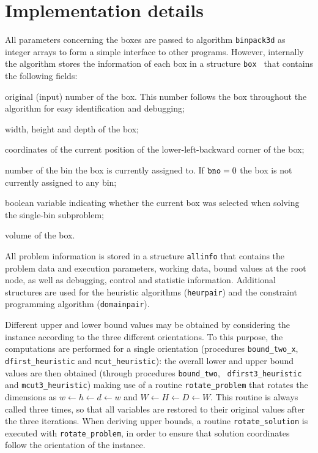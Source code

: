 \section{Implementation details}\label{datastruct}

All parameters {concerning the boxes}
are passed to algorithm {\tt binpack3d} as integer
arrays to form a simple interface to other programs. {However,
internally the algorithm stores} the information of each box in a
structure {\tt box
} that contains the following fields:
\medskip

\noindent
%
 \parbox[t]{13.5cm}{original (input) number of the box. This
number follows the box throughout the algorithm for easy
identification and debugging;}\medskip

\noindent
{} \parbox[t]{13.5cm}{width,
height and depth of the box;}\medskip

\noindent
{} \parbox[t]{13.5cm}{coordinates of
the current position of the lower-left-backward corner of the
box;}\medskip

\noindent
{}
\parbox[t]{13.5cm}{number of the bin the box is currently assigned
to. If ${\tt bno}=0$ the box is not currently assigned to any
bin;}\medskip

\noindent
{} \parbox[t]{13.5cm}{boolean
variable indicating whether the current box was selected when
solving the single-bin subproblem;}\medskip

\noindent
{}
\parbox[t]{13.5cm}{volume of the box.}
\medskip

\noindent
{All problem information is stored in a structure {\tt allinfo}
that contains the problem data and execution parameters, working data,
bound values at the root node, as well as debugging, control and statistic
information. Additional structures are used for the heuristic algorithms
({\tt heurpair}) and the constraint programming algorithm
({\tt domainpair}).
}

Different upper and lower bound values may be
obtained by considering the instance according to the three
different orientations. {To this purpose, the computations are
performed for a single orientation (procedures {\tt bound\_two\_x},
{\tt dfirst\_heuristic} and {\tt mcut\_heuristic}): the overall lower and
upper bound values are then obtained (through procedures {\tt bound\_two}, {\tt
dfirst3\_heuristic} and {\tt mcut3\_heuristic})
making use of a routine {\tt rotate\_problem} that rotates the
dimensions as $w \leftarrow h \leftarrow d \leftarrow w$ and
$W \leftarrow H \leftarrow D \leftarrow W$.}
This routine is always called three times, so that all variables
are restored to their original values after the three iterations.
When deriving upper bounds, a routine {\tt rotate\_solution} is
executed with {\tt rotate\_problem}, in order to ensure that
solution coordinates follow the orientation of the instance.

